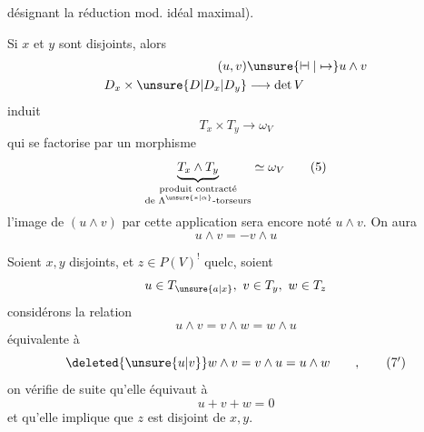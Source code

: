 désignant la réduction mod. idéal maximal).

Si $x$ et $y$ sont disjoints, alors  
\[
\begin{aligned}
 (u,v)&\unsure{\mathrel{\vdash\mkern-8mu\dashv}|\mapsto}u\wedge v\\
 D_x\times\unsure{D|D_x|D_y}&\longrightarrow\det V
\end{aligned}
\]
induit
\[
T_x\times T_y\longrightarrow\omega_V
\]
qui se factorise par un morphisme
\[
\underbrace{T_x\wedge T_y}_{\substack{\text{produit contracté}\\\text{de }\Lambda^{\unsure{*|\alpha}}\text{-torseurs}}}\simeq\omega_V
\tag*{(5)}
\]
 l'image  de $(u\wedge v)$ par cette application sera encore noté $u\wedge v$. On aura
\[
u\wedge v=-v\wedge u
\tag*{(6)}
\]

Soient $x,y$  disjoints, et $z\in P(V)^!$ quelc, soient
\[
u\in T_{\unsure{a|x}},\ v\in T_y,\ w\in T_z
\]
considérons la relation
\[
u\wedge v=v\wedge w=w\wedge u
\tag*{(7)}
\]
équivalente à
\[
\deleted{\unsure{u|v}}w\wedge v=v\wedge u=u\wedge w\qquad,
\tag*{(7$'$)}
\]
on vérifie de suite qu'elle équivaut à
\[
u+v+w=0
\tag*{(8)}
\]
et qu'elle implique que $z$ est disjoint de $x,y$.
